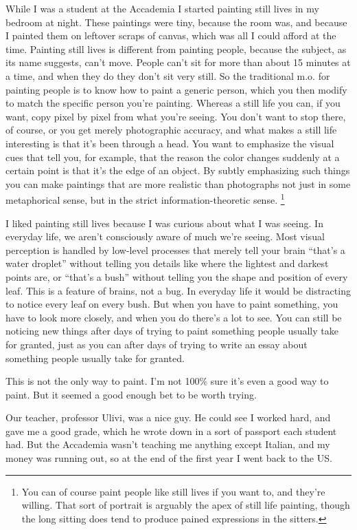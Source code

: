 \documentclass[12pt]{book}
\begin{document}
While I was a student at the Accademia I started painting still lives in
my bedroom at night. These paintings were tiny, because the room was,
and because I painted them on leftover scraps of canvas, which was all I
could afford at the time. Painting still lives is different from
painting people, because the subject, as its name suggests, can't move.
People can't sit for more than about 15 minutes at a time, and when they
do they don't sit very still. So the traditional m.o. for painting
people is to know how to paint a generic person, which you then modify
to match the specific person you're painting. Whereas a still life you
can, if you want, copy pixel by pixel from what you're seeing. You don't
want to stop there, of course, or you get merely photographic accuracy,
and what makes a still life interesting is that it's been through a
head. You want to emphasize the visual cues that tell you, for example,
that the reason the color changes suddenly at a certain point is that
it's the edge of an object. By subtly emphasizing such things you can
make paintings that are more realistic than photographs not just in some
metaphorical sense, but in the strict information-theoretic sense.
\footnote{You can of course paint people like still lives if you want to,
and they're willing. That sort of portrait is arguably the apex of still
life painting, though the long sitting does tend to produce pained
expressions in the sitters.}

I liked painting still lives because I was curious about what I was
seeing. In everyday life, we aren't consciously aware of much we're
seeing. Most visual perception is handled by low-level processes that
merely tell your brain ``that's a water droplet'' without telling you
details like where the lightest and darkest points are, or ``that's a
bush'' without telling you the shape and position of every leaf. This is
a feature of brains, not a bug. In everyday life it would be distracting
to notice every leaf on every bush. But when you have to paint
something, you have to look more closely, and when you do there's a lot
to see. You can still be noticing new things after days of trying to
paint something people usually take for granted, just as you can after
days of trying to write an essay about something people usually take for
granted.

This is not the only way to paint. I'm not 100\% sure it's even a good
way to paint. But it seemed a good enough bet to be worth trying.

Our teacher, professor Ulivi, was a nice guy. He could see I worked
hard, and gave me a good grade, which he wrote down in a sort of
passport each student had. But the Accademia wasn't teaching me anything
except Italian, and my money was running out, so at the end of the first
year I went back to the US.
\end{document}
